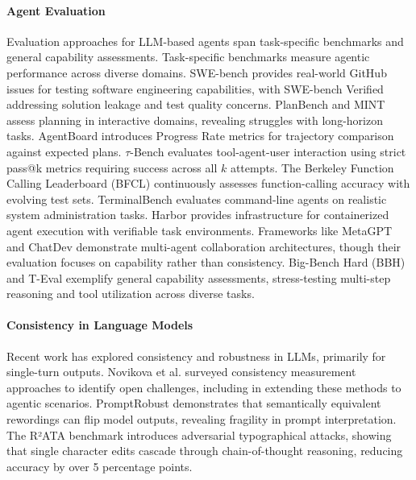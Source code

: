 \documentclass{article}
\theoremstyle{plain}
\theoremstyle{definition}
\theoremstyle{remark}
\begin{document}
\paragraph{Agent Evaluation}
Evaluation approaches for LLM-based agents span task-specific benchmarks and general capability assessments. Task-specific benchmarks measure agentic performance across diverse domains. SWE-bench \cite{jimenez2024swebench} provides real-world GitHub issues for testing software engineering capabilities, with SWE-bench Verified addressing solution leakage and test quality concerns. PlanBench and MINT assess planning in interactive domains, revealing struggles with long-horizon tasks. AgentBoard introduces Progress Rate metrics for trajectory comparison against expected plans. $\tau$-Bench evaluates tool-agent-user interaction using strict pass@k metrics requiring success across all $k$ attempts. The Berkeley Function Calling Leaderboard (BFCL) \cite{patil2024bfcl} continuously assesses function-calling accuracy with evolving test sets. TerminalBench \cite{wang2024terminalbench} evaluates command-line agents on realistic system administration tasks. Harbor \cite{harbor2024} provides infrastructure for containerized agent execution with verifiable task environments. Frameworks like MetaGPT \cite{hong2023metagpt} and ChatDev \cite{qian2023chatdev} demonstrate multi-agent collaboration architectures, though their evaluation focuses on capability rather than consistency. Big-Bench Hard (BBH) and T-Eval exemplify general capability assessments, stress-testing multi-step reasoning and tool utilization across diverse tasks.

\paragraph{Consistency in Language Models}
Recent work has explored consistency and robustness in LLMs, primarily for single-turn outputs. Novikova et al. \cite{novikova2025consistencylanguagemodelscurrent} surveyed consistency measurement approaches to identify open challenges, including in extending these methods to agentic scenarios. PromptRobust \cite{zhu2023promptrobust} demonstrates that semantically equivalent rewordings can flip model outputs, revealing fragility in prompt interpretation. The R²ATA benchmark \cite{gan2024r2ata} introduces adversarial typographical attacks, showing that single character edits cascade through chain-of-thought reasoning, reducing accuracy by over 5 percentage points.
\end{document}
